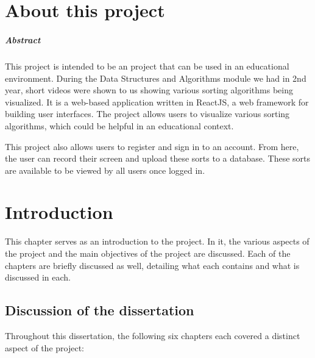 \chapter*{About this project}
\paragraph{Abstract}
This project is intended to be an project that can be used in an educational 
environment. During the Data Structures and Algorithms module we had in 2nd year,
short videos were shown to us showing various sorting algorithms being 
visualized. It is a web-based application written in ReactJS, a web framework 
for building user interfaces. The project allows users to visualize various
sorting algorithms, which could be helpful in an educational context.
\par
\bigskip
This project also allows users to register and sign in to an account. From here, the user can record their screen and upload these sorts to a database. These sorts are available to be viewed by all users once logged in.

\chapter{Introduction}
This chapter serves as an introduction to the project. In it, the various aspects
of the project and the main objectives of the project are discussed. Each of the 
chapters are briefly discussed as well, detailing what each contains and what is
discussed in each.

\section{Discussion of the dissertation}
Throughout this dissertation, the following six chapters each covered a distinct aspect of the project:

